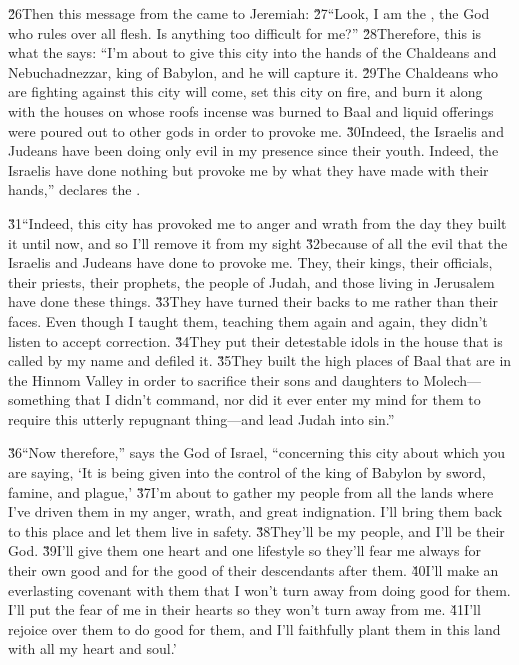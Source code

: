 \v{26}Then this message from the  came to Jeremiah: \v{27}``Look, I am the , the God who rules over all flesh. Is anything too difficult for me?'' \v{28}Therefore, this is what the  says: ``I'm about to give this city into the hands of the Chaldeans and Nebuchadnezzar, king of Babylon, and he will capture it. \v{29}The Chaldeans who are fighting against this city will come, set this city on fire, and burn it along with the houses on whose roofs incense was burned to Baal and liquid offerings were poured out to other gods in order to provoke me. \v{30}Indeed, the Israelis and Judeans have been doing only evil in my presence since their youth. Indeed, the Israelis have done nothing but provoke me by what they have made with their hands,'' declares the .

\v{31}``Indeed, this city has provoked me to anger and wrath from the day they built it until now, and so I'll remove it from my sight \v{32}because of all the evil that the Israelis and Judeans have done to provoke me. They, their kings, their officials, their priests, their prophets, the people of Judah, and those living in Jerusalem have done these things. \v{33}They have turned their backs to me rather than their faces. Even though I taught them, teaching them again and again, they didn't listen to accept correction. \v{34}They put their detestable idols in the house that is called by my name and defiled it. \v{35}They built the high places of Baal that are in the Hinnom Valley in order to sacrifice their sons and daughters to Molech---something that I didn't command, nor did it ever enter my mind for them to require this utterly repugnant thing---and lead Judah into sin.''

\v{36}``Now therefore,'' says the  God of Israel, ``concerning this city about which you are saying, `It is being given into the control of the king of Babylon by sword, famine, and plague,' \v{37}I'm about to gather my people from all the lands where I've driven them in my anger, wrath, and great indignation. I'll bring them back to this place and let them live in safety. \v{38}They'll be my people, and I'll be their God. \v{39}I'll give them one heart and one lifestyle so they'll fear me always for their own good and for the good of their descendants after them. \v{40}I'll make an everlasting covenant with them that I won't turn away from doing good for them. I'll put the fear of me in their hearts so they won't turn away from me. \v{41}I'll rejoice over them to do good for them, and I'll faithfully plant them in this land with all my heart and soul.'

